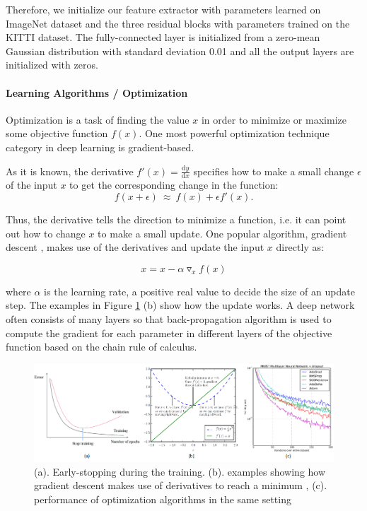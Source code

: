 \documentclass[a4paper,12pt]{article}
\begin{document}
Therefore, we initialize our feature extractor with parameters learned on ImageNet dataset \cite{DBLP:Russakovsky14} and the three residual blocks with parameters trained on the KITTI dataset. The fully-connected layer is initialized from a zero-mean Gaussian distribution with standard deviation 0.01 and all the output layers are initialized with zeros.


\paragraph{Learning Algorithms / Optimization}

Optimization is a task of finding the value $x$ in order to minimize or maximize some objective function $f(x)$. One most powerful optimization technique category in deep learning is gradient-based.

As it is known, the derivative $f'(x)=\frac{\text{d}y}{\text{d}x}$ specifies how to make a small change $\epsilon$ of the input $x$ to get the corresponding change in the function:
\begin{equation}
	f(x + \epsilon)~ \approx ~ f(x) + \epsilon f'(x).
\end{equation}

Thus, the derivative tells the direction to minimize a function, i.e. it can point out how to change $x$ to make a small update. One popular algorithm, gradient descent \cite{gd1847}, makes use of the derivatives and update the input $x$ directly as:

\begin{equation}
x = x - \alpha {\triangledown} _x f(x)
\end{equation}

where $\alpha$ is the learning rate, a positive real value to decide the size of an update step. The examples in Figure \ref{figure:optimization} (b) show how the update works.  A deep network often consists of many layers so that back-propagation algorithm \cite{Rumelhart:1988:LRB:65669.104451} is used to compute the gradient for each parameter in different layers of the objective function based on the chain rule of calculus.

\begin{figure}[h]		
	\includegraphics[width=1\textwidth]{optimization.png}
	\caption[Optimization]{(a). Early-stopping during the training. (b). examples showing how gradient descent makes use of derivatives to reach a minimum \cite{Goodfellow-et-al-2016}, (c). performance of optimization algorithms in the same setting \cite{DBLP:journals/corr/KingmaB14}}
	\centering
	\label{figure:optimization}
\end{figure}
\end{document}
